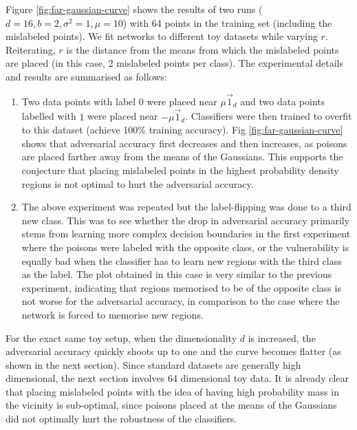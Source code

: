 \documentclass{ociamthesis}
\begin{document}
Figure \ref{fig:far-gaussian-curve} shows the results of two runs ($d=16, b=2,
\sigma^2=1, \mu=10$) with 64 points in the training set (including the
mislabeled points). We fit networks to different toy datasets while varying $r$.
Reiterating, $r$ is the distance from the means from which the mislabeled points
are placed (in this case, 2 mislabeled points per class). The experimental
details and results are summarised as follows:

\begin{enumerate}
    \item Two data points with label $0$ were placed near $\mu\vec{1}_d$ and two
    data points labelled with $1$ were placed near $-\mu\vec{1}_d$. Classifiers
    were then trained to overfit to this dataset (achieve 100\% training
    accuracy). Fig \ref{fig:far-gaussian-curve} shows that adversarial accuracy
    first decreases and then increases, as poisons are placed farther away from
    the means of the Gaussians. This supports the conjecture that placing
    mislabeled points in the highest probability density regions is not optimal
    to hurt the adversarial accuracy.
    \item The above experiment was repeated but the label-flipping was done to a
    third new class. This was to see whether the drop in adversarial accuracy
    primarily stems from learning more complex decision boundaries in the first
    experiment where the poisons were labeled with the opposite class, or the
    vulnerability is equally bad when the classifier has to learn new regions
    with the third class as the label. The plot obtained in this case is very
    similar to the previous experiment, indicating that regions memorised to be
    of the opposite class is not worse for the adversarial accuracy, in
    comparison to the case where the network is forced to memorise new regions.
\end{enumerate}

For the exact same toy setup, when the dimensionality $d$ is increased, the
adversarial accuracy quickly shoots up to one and the curve becomes flatter (as
shown in the next section). Since standard datasets are generally high
dimensional, the next section involves 64 dimensional toy data. It is already
clear that placing mislabeled points with the idea of having high probability
mass in the vicinity is sub-optimal, since poisons placed at the means of the
Gaussians did not optimally hurt the robustness of the classifiers.
\end{document}

